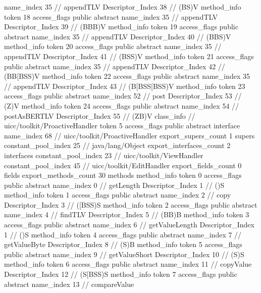 {{{{{					name_index	35		// appendTLV
					Descriptor_Index	38		// (BS)V
				}
				method_info {
					token	18
					access_flags	public abstract
					name_index	35		// appendTLV
					Descriptor_Index	39		// (BBB)V
				}
				method_info {
					token	19
					access_flags	public abstract
					name_index	35		// appendTLV
					Descriptor_Index	40		// (BBS)V
				}
				method_info {
					token	20
					access_flags	public abstract
					name_index	35		// appendTLV
					Descriptor_Index	41		// (BSS)V
				}
				method_info {
					token	21
					access_flags	public abstract
					name_index	35		// appendTLV
					Descriptor_Index	42		// (BB[BSS)V
				}
				method_info {
					token	22
					access_flags	public abstract
					name_index	35		// appendTLV
					Descriptor_Index	43		// (B[BSS[BSS)V
				}
				method_info {
					token	23
					access_flags	public abstract
					name_index	52		// post
					Descriptor_Index	53		// (Z)V
				}
				method_info {
					token	24
					access_flags	public abstract
					name_index	54		// postAsBERTLV
					Descriptor_Index	55		// (ZB)V
				}
			}
		}
		class_info {		// uicc/toolkit/ProactiveHandler
			token	5
			access_flags	public abstract interface
			name_index	68		// uicc/toolkit/ProactiveHandler
			export_supers_count	1
			supers {
				constant_pool_index	25		// java/lang/Object
			}
			export_interfaces_count	2
			interfaces {
				constant_pool_index	23		// uicc/toolkit/ViewHandler
				constant_pool_index	45		// uicc/toolkit/EditHandler
			}
			export_fields_count	0
			fields {
			}
			export_methods_count	30
			methods {
				method_info {
					token	0
					access_flags	public abstract
					name_index	0		// getLength
					Descriptor_Index	1		// ()S
				}
				method_info {
					token	1
					access_flags	public abstract
					name_index	2		// copy
					Descriptor_Index	3		// ([BSS)S
				}
				method_info {
					token	2
					access_flags	public abstract
					name_index	4		// findTLV
					Descriptor_Index	5		// (BB)B
				}
				method_info {
					token	3
					access_flags	public abstract
					name_index	6		// getValueLength
					Descriptor_Index	1		// ()S
				}
				method_info {
					token	4
					access_flags	public abstract
					name_index	7		// getValueByte
					Descriptor_Index	8		// (S)B
				}
				method_info {
					token	5
					access_flags	public abstract
					name_index	9		// getValueShort
					Descriptor_Index	10		// (S)S
				}
				method_info {
					token	6
					access_flags	public abstract
					name_index	11		// copyValue
					Descriptor_Index	12		// (S[BSS)S
				}
				method_info {
					token	7
					access_flags	public abstract
					name_index	13		// compareValue
}}}}}

